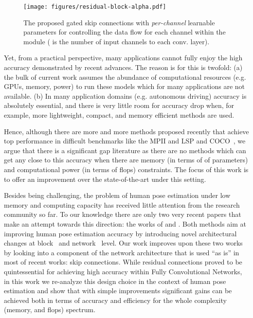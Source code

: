 \documentclass[a4paper, 10pt, conference]{ieeeconf}      \usepackage{FG2020}
\begin{document}
\begin{figure}[t]
\centering
\texttt{[image: figures/residual-block-alpha.pdf]}
\caption{The proposed gated skip connections with \textit{per-channel} learnable parameters for controlling the data flow for each channel within the module ( is the number of input channels to each conv. layer).}
\label{fig:residul-block-alpha}
\end{figure}

Yet, from a practical perspective, many applications cannot fully enjoy the high accuracy demonstrated by recent advances. The reason is for this is twofold: (a) the bulk of current work assumes the abundance of computational resources (e.g. GPUs, memory, power) to run these models which for many applications are not available. (b) In many application domains (e.g. autonomous driving) accuracy is absolutely essential, and there is very little room for accuracy drop when, for example, more lightweight, compact, and memory efficient methods are used. 

Hence, although there are more and more methods proposed recently that achieve top performance in difficult benchmarks like the MPII \cite{andriluka14cvpr} and LSP \cite{Johnson10} and COCO~\cite{lin2014microsoft}, we argue that there is a significant gap literature as there are no methods which can get any close to this accuracy when there are memory (in terms of  of parameters) and computational power (in terms of flops) constraints. The focus of this work is to offer an improvement over the state-of-the-art under this setting.

Besides being challenging, the problem of human pose estimation under low memory and computing capacity has received little attention from the research community so far. 
To our knowledge there are only two very recent papers that make an attempt towards this direction: the works of \cite{bulat2017binarized} and \cite{tang2018quantized}.
Both methods aim at improving human pose estimation accuracy by introducing novel architectural changes at block~\cite{bulat2017binarized} and network~\cite{tang2018quantized} level. Our work improves upon these two works by looking into a component of the network architecture that is used ``as is'' in most of recent works: skip connections. While residual connections proved to be quintessential for achieving high accuracy within Fully Convolutional Networks, in this work we re-analyze this design choice in the context of human pose estimation and show that with simple improvements significant gains can be achieved both in terms of accuracy and efficiency for the whole complexity (memory, and flops) spectrum.
\end{document}
